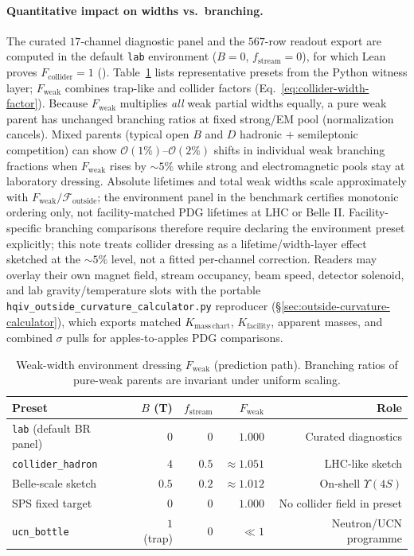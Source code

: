 \documentclass[11pt]{amsart}
\newcommand{\leanid}[1]{{\footnotesize\path{#1}}}
\begin{document}
\paragraph{Quantitative impact on widths vs.\ branching.}
The curated $17$-channel diagnostic panel and the $567$-row readout export are
computed in the default \texttt{lab} environment ($B=0$, $f_{\mathrm{stream}}=0$),
for which Lean proves $F_{\mathrm{collider}}=1$
(\leanid{colliderCurvatureWidthFactor_vacuum}).
Table~\ref{tab:collider-dressing} lists representative presets from the Python
witness layer; $F_{\mathrm{weak}}$ combines trap-like and collider factors
(Eq.~\eqref{eq:collider-width-factor}).
Because $F_{\mathrm{weak}}$ multiplies \emph{all} weak partial widths equally,
a pure weak parent has unchanged branching ratios at fixed strong/EM pool
(normalization cancels).
Mixed parents (typical open $B$ and $D$ hadronic $+$ semileptonic competition)
can show $\mathcal{O}(1\%)$--$\mathcal{O}(2\%)$ shifts in individual weak
branching fractions when $F_{\mathrm{weak}}$ rises by $\sim 5\%$ while strong
and electromagnetic pools stay at laboratory dressing.
Absolute lifetimes and total weak widths scale approximately with
$F_{\mathrm{weak}}/\mathcal{F}_{\mathrm{outside}}$; the environment panel in
the benchmark certifies monotonic ordering only, not facility-matched PDG lifetimes
at LHC or Belle II.
Facility-specific branching comparisons therefore require declaring the
environment preset explicitly; this note treats collider dressing as a
lifetime/width-layer effect sketched at the $\sim 5\%$ level, not a fitted
per-channel correction.
Readers may overlay their own magnet field, stream occupancy, beam speed,
detector solenoid, and lab gravity/temperature slots with the portable
\texttt{hqiv\_outside\_curvature\_calculator.py} reproducer
(\S\ref{sec:outside-curvature-calculator}), which exports matched
$K_{\mathrm{mass\,chart}}$, $K_{\mathrm{facility}}$, apparent masses, and
combined $\sigma$ pulls for apples-to-apples PDG comparisons.

\begin{table}[ht]
\centering
\caption{Weak-width environment dressing $F_{\mathrm{weak}}$ (prediction path).
Branching ratios of pure-weak parents are invariant under uniform scaling.}
\label{tab:collider-dressing}
\small
\begin{tabular}{@{}lrrrr@{}}
\toprule
Preset & $B$ (T) & $f_{\mathrm{stream}}$ & $F_{\mathrm{weak}}$ & Role \\
\midrule
\texttt{lab} (default BR panel) & $0$ & $0$ & $1.000$ & Curated diagnostics \\
\texttt{collider\_hadron} & $4$ & $0.5$ & $\approx 1.051$ & LHC-like sketch \\
Belle-scale sketch & $0.5$ & $0.2$ & $\approx 1.012$ & On-shell $\Upsilon(4S)$ \\
SPS fixed target & $0$ & $0$ & $1.000$ & No collider field in preset \\
\texttt{ucn\_bottle} & $1$ (trap) & $0$ & $\ll 1$ & Neutron/UCN programme \\
\bottomrule
\end{tabular}
\end{table}
\end{document}
